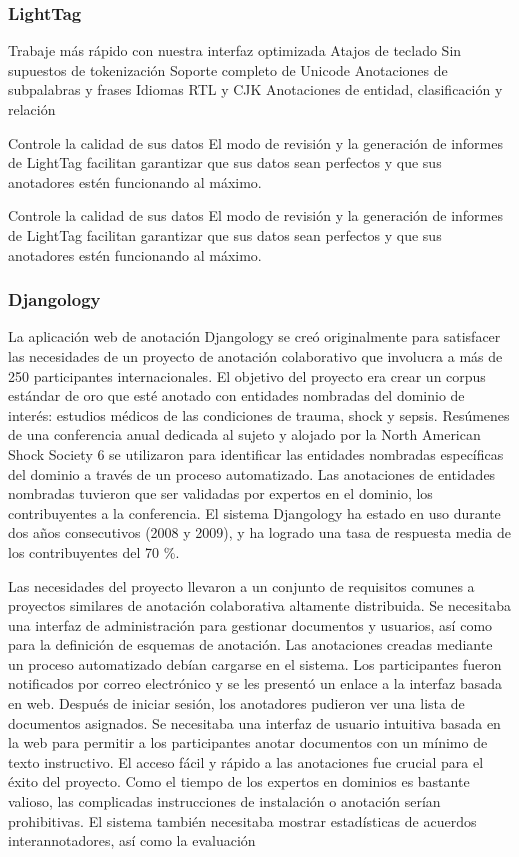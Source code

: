 \subsubsection*{LightTag}

Trabaje más rápido con nuestra interfaz optimizada
Atajos de teclado
Sin supuestos de tokenización
Soporte completo de Unicode
Anotaciones de subpalabras y frases
Idiomas RTL y CJK
Anotaciones de entidad, clasificación y relación

Controle la calidad de sus datos
El modo de revisión y la generación de informes de LightTag facilitan garantizar que sus datos sean perfectos y que sus anotadores estén funcionando al máximo.

Controle la calidad de sus datos
El modo de revisión y la generación de informes de LightTag facilitan garantizar que sus datos sean perfectos y que sus anotadores estén funcionando al máximo.

\subsubsection*{Djangology}

La aplicación web de anotación Djangology se creó originalmente para satisfacer las necesidades de un proyecto de anotación colaborativo que involucra a más de 250 participantes internacionales. El objetivo del proyecto era crear un corpus estándar de oro que esté anotado con entidades nombradas del dominio de interés: estudios médicos de las condiciones de trauma, shock y sepsis. Resúmenes de una conferencia anual dedicada
al sujeto y alojado por la North American Shock Society 6 se utilizaron para identificar las entidades nombradas específicas del dominio a través de un proceso automatizado. Las anotaciones de entidades nombradas tuvieron que ser validadas por expertos en el dominio, los contribuyentes a la conferencia. El sistema Djangology
ha estado en uso durante dos años consecutivos (2008 y 2009), y ha logrado una tasa de respuesta media de los contribuyentes del 70 \%.

Las necesidades del proyecto llevaron a un conjunto de requisitos comunes a proyectos similares de anotación colaborativa altamente distribuida. Se necesitaba una interfaz de administración para gestionar documentos y usuarios, así como para la definición de esquemas de anotación. Las anotaciones creadas mediante un proceso automatizado debían cargarse en el sistema. Los participantes fueron notificados por correo electrónico y se les presentó un enlace a la interfaz basada en web. Después de iniciar sesión, los anotadores pudieron ver una lista de documentos asignados. Se necesitaba una interfaz de usuario intuitiva basada en la web para permitir a los participantes anotar documentos con un mínimo de texto instructivo. El acceso fácil y rápido a las anotaciones fue crucial para el éxito del proyecto. Como el tiempo de los expertos en dominios es bastante valioso, las complicadas instrucciones de instalación o anotación serían prohibitivas. El sistema también necesitaba mostrar estadísticas de acuerdos interannotadores, así como la evaluación

